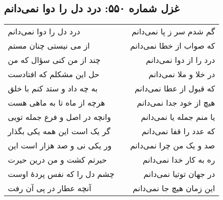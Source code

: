 \begin{center}
\section*{غزل شماره ۵۵۰: درد دل را دوا نمی‌دانم}
\label{sec:550}
\begin{longtable}{l p{0.5cm} r}
درد دل را دوا نمی‌دانم
&&
گم شدم سر ز پا نمی‌دانم
\\
از می نیستی چنان مستم
&&
که صواب از خطا نمی‌دانم
\\
چند از من کنی سؤال که من
&&
درد را از دوا نمی‌دانم
\\
حل این مشکلم که افتادست
&&
در خلا و ملا نمی‌دانم
\\
به چه داد و ستد کنم با خلق
&&
که قبول از عطا نمی‌دانم
\\
هرچه از ماه تا به ماهی هست
&&
هیچ از خود جدا نمی‌دانم
\\
وانچه در اصل و فرع جمله تویی
&&
یا منم جمله یا نمی‌دانم
\\
گر یک است این همه یکی بگذار
&&
که عدد را قفا نمی‌دانم
\\
ور یکی نی و صد هزار است این
&&
صد و یک من چرا نمی‌دانم
\\
حیرتم کشت و من درین حیرت
&&
ره به کار خدا نمی‌دانم
\\
چشم دل را که نفس پردهٔ اوست
&&
در جهان توتیا نمی‌دانم
\\
آنچه عطار در پی آن رفت
&&
این زمان هیچ جا نمی‌دانم
\\
\end{longtable}
\end{center}
